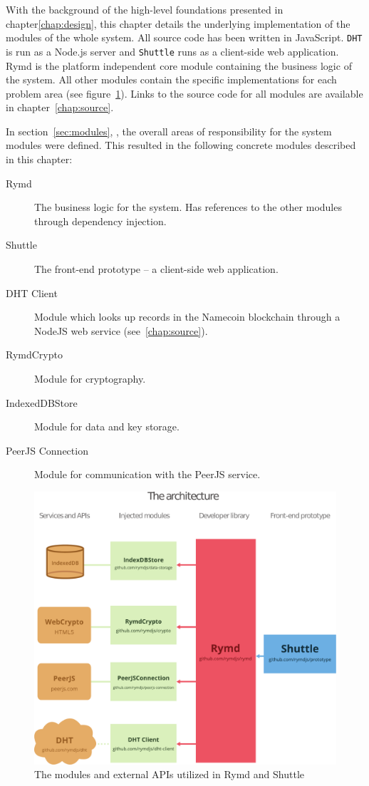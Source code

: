 With the background of the high-level foundations presented in chapter\ref{chap:design}, this chapter details the underlying implementation of the modules of the whole system. All source code has been written in JavaScript. \texttt{DHT} is run as a Node.js server and \texttt{Shuttle} runs as a client-side web application. Rymd is the platform independent core module containing the business logic of the system. All other modules contain the specific implementations for each problem area (see figure~\ref{fig:architecture}). Links to the source code for all modules are available in chapter~\ref{chap:source}.

In section~\ref{sec:modules}, , the overall areas of responsibility for the system modules were defined. This resulted in the following concrete modules described in this chapter:

\begin{description}
  \item[Rymd] The business logic for the system. Has references to the other modules through dependency injection.
  \item[Shuttle] The front-end prototype – a client-side web application.
  \item[DHT Client] Module which looks up records in the Namecoin blockchain through a NodeJS web service (see~\ref{chap:source}).
  \item[RymdCrypto] Module for cryptography.
  \item[IndexedDBStore] Module for data and key storage.
  \item[PeerJS Connection] Module for communication with the PeerJS service.
\end{description}

\begin{figure}[ht]
\centering
\includegraphics[width=\textwidth,height=0.4\paperheight,keepaspectratio
]{figures/architecture}
\caption{The modules and external APIs utilized in Rymd and Shuttle}
\label{fig:architecture}
\end{figure}

